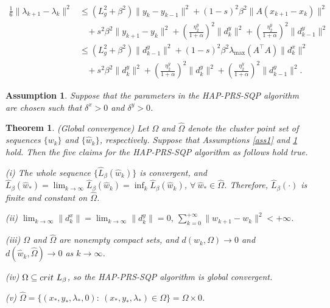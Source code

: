 \documentclass[10pt,a4paper]{amsart}
\newtheorem{theorem}{Theorem}
\newtheorem{assumption}{Assumption}
\begin{document}
	\begin{align}
		\frac{1}{6}\|\lambda_{k+1}-\lambda_{k}\|^{2}
		&\leq(L_{g}^{2}+\beta^2)\|y_{k}-y_{k-1}\|^{2}+(1-s)^{2}\beta^{2}\|A(x_{k+1}-x_{k})\|^{2}\nonumber\\
		&\ \ \ \ +s^{2}\beta^{2}\|y_{k+1}-y_{k}\|^{2}  +\left(\frac{\eta_2^y}{1+\alpha}\right)^2\|d_k^y\|^2+\left(\frac{\eta_2^y}{1+\alpha}\right)^2\|d_{k-1}^y\|^2 \nonumber\\
		&\leq(L_{g}^{2}+\beta^2)\|d_{k-1}^y\|^{2}+(1-s)^{2}\beta^{2}\lambda_{\max}(A^{\top}A)\|d_{k}^x\|^{2}\nonumber\\
		&\ \ \ \ + s^{2}\beta^{2}\|d_{k}^y\|^{2}+\left(\frac{\eta_2^y}{1+\alpha}\right)^2\|d_k^y\|^2+\left(\frac{\eta_2^y}{1+\alpha}\right)^2\|d_{k-1}^y\|^2. \label{LK1LK}
	\end{align}

\begin{assumption}\label{ass3}{\rm Suppose that the parameters in the HAP-PRS-SQP algorithm are chosen such that
$\delta^x> 0$ and $\delta^y> 0$. 
}\end{assumption}

\begin{theorem}\label{the1}(Global convergence) Let $\Omega$ and $\hat{\Omega}$ denote the cluster point set of sequences $\{w_{k}\}$ and $\{\hat{w}_{k}\}$, respectively. Suppose that Assumptions \ref{ass1} and \ref{ass3} hold. Then the five claims for the HAP-PRS-SQP algorithm as follows hold true.

(i) The whole sequence $\{\hat{L}_{\beta}(\hat{w}_k)\}$ is convergent, and $\hat{L}_{\beta}(\hat{w}_*)=\lim_{k \to \infty }\hat{L}_{\beta}(\hat{w}_k)=\inf_{k}\hat{L}_{\beta}(\hat{w}_k)$, $\forall~\hat{w}_* \in \hat{\Omega}$. Therefore, $\hat{L}_{\beta}(\cdot)$ is finite and constant on $\hat{\Omega}$.

(ii) $ \lim_{k\to\infty}\|d_k^x\|=\lim_{k\to\infty}\|d_k^y\|=0,~\sum_{k=0}^{+\infty}\| w_{k+1}-w_k \|^2<+\infty$.

(iii) $\Omega$ and $\hat{\Omega}$ are nonempty compact sets, and  $d(w_k, \Omega) \to 0$ and $d(\hat{w}_k, \hat{\Omega}) \to 0$ as $k \to \infty$.

(iv) $\Omega \subseteq {\rm crit}~L_{\beta}$, so the HAP-PRS-SQP algorithm is global convergent.

(v) $\hat{\Omega} = \{(x_*,y_*,\lambda_*,0):~(x_*,y_*,\lambda_*) \in \Omega\}=\Omega\times {0}$.
\end{theorem}
\end{document}
